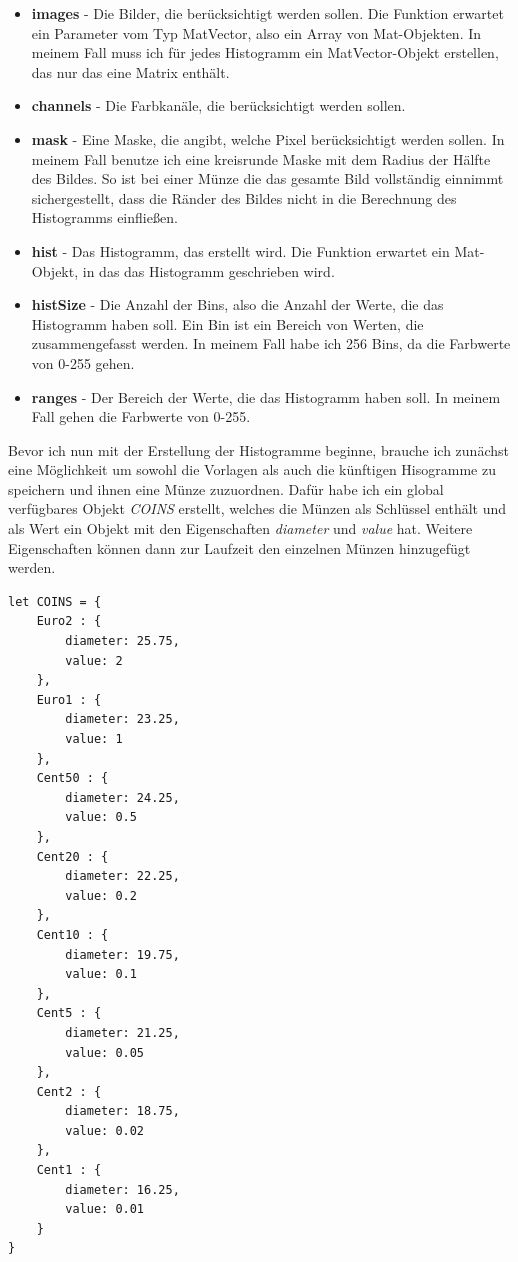 \begin{itemize}
    \item \textbf{images} - Die Bilder, die berücksichtigt werden sollen. Die Funktion erwartet ein Parameter vom Typ MatVector, also ein Array von Mat-Objekten. In meinem Fall muss ich für jedes Histogramm ein MatVector-Objekt erstellen, das nur das eine Matrix enthält.
    \item \textbf{channels} - Die Farbkanäle, die berücksichtigt werden sollen.
    \item \textbf{mask} - Eine Maske, die angibt, welche Pixel berücksichtigt werden sollen. In meinem Fall benutze ich eine kreisrunde Maske mit dem Radius der Hälfte des Bildes. So ist bei einer Münze die das gesamte Bild vollständig einnimmt sichergestellt, dass die Ränder des Bildes nicht in die Berechnung des Histogramms einfließen.
    \item \textbf{hist} - Das Histogramm, das erstellt wird. Die Funktion erwartet ein Mat-Objekt, in das das Histogramm geschrieben wird.
    \item \textbf{histSize} - Die Anzahl der Bins, also die Anzahl der Werte, die das Histogramm haben soll. Ein Bin ist ein Bereich von Werten, die zusammengefasst werden. In meinem Fall habe ich 256 Bins, da die Farbwerte von 0-255 gehen.
    \item \textbf{ranges} - Der Bereich der Werte, die das Histogramm haben soll. In meinem Fall gehen die Farbwerte von 0-255.
\end{itemize}

Bevor ich nun mit der Erstellung der Histogramme beginne, brauche ich zunächst eine Möglichkeit um sowohl die Vorlagen als auch die künftigen Hisogramme zu speichern und ihnen eine Münze zuzuordnen. Dafür habe ich ein global verfügbares Objekt \textit{COINS} erstellt, welches die Münzen als Schlüssel enthält und als Wert ein Objekt mit den Eigenschaften \textit{diameter} und \textit{value} hat. Weitere Eigenschaften können dann zur Laufzeit den einzelnen Münzen hinzugefügt werden.

\begin{lstlisting}[style=JavaScript]
let COINS = {
    Euro2 : {
        diameter: 25.75,
        value: 2
    },
    Euro1 : {
        diameter: 23.25,
        value: 1
    },
    Cent50 : {
        diameter: 24.25,
        value: 0.5
    },
    Cent20 : {
        diameter: 22.25,
        value: 0.2
    },
    Cent10 : {
        diameter: 19.75,
        value: 0.1
    },
    Cent5 : {
        diameter: 21.25,
        value: 0.05
    },
    Cent2 : {
        diameter: 18.75,
        value: 0.02
    },
    Cent1 : {
        diameter: 16.25,
        value: 0.01
    }
}    
\end{lstlisting}

